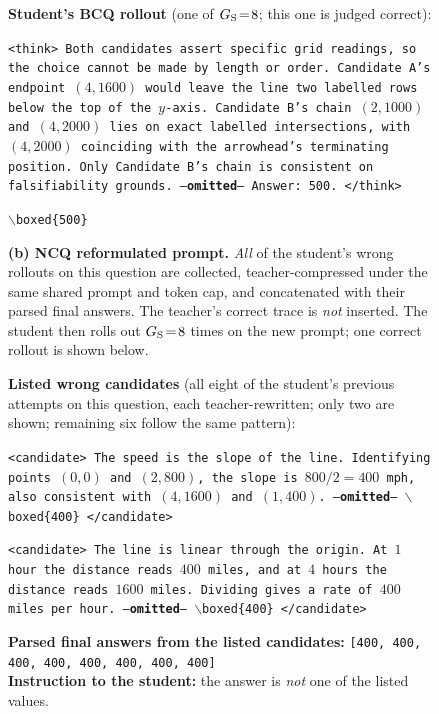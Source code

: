 \begin{figure}[!p]
\begin{prompttemplatefig}
\textbf{Student's BCQ rollout} (one of $G_{\rm S}\!=\!8$; this one is judged correct):

\smallskip
\texttt{<think> Both candidates assert specific grid readings, so the choice cannot be made by length or order. Candidate~A's endpoint $(4, 1600)$ would leave the line two labelled rows below the top of the $y$-axis. Candidate~B's chain $(2, 1000)$ and $(4, 2000)$ lies on exact labelled intersections, with $(4, 2000)$ coinciding with the arrowhead's terminating position. Only Candidate~B's chain is consistent on falsifiability grounds. ---\textbf{omitted}--- Answer: 500. </think>}

\smallskip
\texttt{$\backslash$boxed\{500\}} \quad \textcolor{posgain}{\checkmark}
\end{prompttemplatefig}

\vspace{1pt}\noindent\textbf{(b) NCQ reformulated prompt.} \emph{All} of the student's wrong rollouts on this question are collected, teacher-compressed under the same shared prompt and token cap, and concatenated with their parsed final answers. The teacher's correct trace is \emph{not} inserted. The student then rolls out $G_{\rm S}\!=\!8$ times on the new prompt; one correct rollout is shown below.

\begin{negcandidatebox}
\textbf{Listed wrong candidates} (all eight of the student's previous attempts on this question, each teacher-rewritten; only two are shown; remaining six follow the same pattern):

\smallskip
\texttt{<candidate> The speed is the slope of the line. Identifying points $(0, 0)$ and $(2, 800)$, the slope is $800/2 = 400$ mph, also consistent with $(4, 1600)$ and $(1, 400)$. ---\textbf{omitted}--- $\backslash$boxed\{400\} </candidate>}

\smallskip
\texttt{<candidate> The line is linear through the origin. At $1$ hour the distance reads $400$ miles, and at $4$ hours the distance reads $1600$ miles. Dividing gives a rate of $400$ miles per hour. ---\textbf{omitted}--- $\backslash$boxed\{400\} </candidate>}

\smallskip
\textbf{Parsed final answers from the listed candidates:} \texttt{[400, 400, 400, 400, 400, 400, 400, 400]} \\
\textbf{Instruction to the student:} the answer is \emph{not} one of the listed values.
\end{negcandidatebox}


\end{figure}
